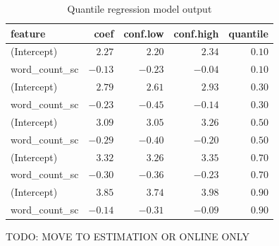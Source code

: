 \documentclass[
  letterpaper,
]{krantz}
\begin{document}
\begin{longtable}{lrrrr}

\caption{\label{tbl-quantile-model-output-multi-quants}Quantile
regression model output}

\tabularnewline

\toprule
feature & coef & conf.low & conf.high & quantile \\ 
\midrule\addlinespace[2.5pt]
(Intercept) & \textcolor[HTML]{404040}{$2.27$} & \textcolor[HTML]{404040}{$2.20$} & \textcolor[HTML]{404040}{$2.34$} & \textcolor[HTML]{404040}{$0.10$} \\ 
word\_count\_sc & \textcolor[HTML]{404040}{$-0.13$} & \textcolor[HTML]{404040}{$-0.23$} & \textcolor[HTML]{404040}{$-0.04$} & \textcolor[HTML]{404040}{$0.10$} \\ 
(Intercept) & \textcolor[HTML]{404040}{$2.79$} & \textcolor[HTML]{404040}{$2.61$} & \textcolor[HTML]{404040}{$2.93$} & \textcolor[HTML]{404040}{$0.30$} \\ 
word\_count\_sc & \textcolor[HTML]{404040}{$-0.23$} & \textcolor[HTML]{404040}{$-0.45$} & \textcolor[HTML]{404040}{$-0.14$} & \textcolor[HTML]{404040}{$0.30$} \\ 
(Intercept) & \textcolor[HTML]{404040}{$3.09$} & \textcolor[HTML]{404040}{$3.05$} & \textcolor[HTML]{404040}{$3.26$} & \textcolor[HTML]{404040}{$0.50$} \\ 
word\_count\_sc & \textcolor[HTML]{404040}{$-0.29$} & \textcolor[HTML]{404040}{$-0.40$} & \textcolor[HTML]{404040}{$-0.20$} & \textcolor[HTML]{404040}{$0.50$} \\ 
(Intercept) & \textcolor[HTML]{404040}{$3.32$} & \textcolor[HTML]{404040}{$3.26$} & \textcolor[HTML]{404040}{$3.35$} & \textcolor[HTML]{404040}{$0.70$} \\ 
word\_count\_sc & \textcolor[HTML]{404040}{$-0.30$} & \textcolor[HTML]{404040}{$-0.36$} & \textcolor[HTML]{404040}{$-0.23$} & \textcolor[HTML]{404040}{$0.70$} \\ 
(Intercept) & \textcolor[HTML]{404040}{$3.85$} & \textcolor[HTML]{404040}{$3.74$} & \textcolor[HTML]{404040}{$3.98$} & \textcolor[HTML]{404040}{$0.90$} \\ 
word\_count\_sc & \textcolor[HTML]{404040}{$-0.14$} & \textcolor[HTML]{404040}{$-0.31$} & \textcolor[HTML]{404040}{$-0.09$} & \textcolor[HTML]{404040}{$0.90$} \\ 
\bottomrule

\end{longtable}

TODO: MOVE TO ESTIMATION OR ONLINE ONLY
\end{document}
